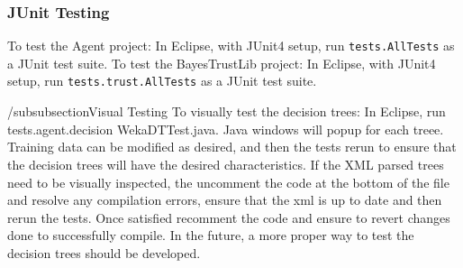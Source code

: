 \subsubsection{JUnit Testing}
To test the Agent project: In Eclipse, with JUnit4 setup, run
\verb+tests.AllTests+ as a JUnit test suite.  To test the BayesTrustLib project:
In Eclipse, with JUnit4 setup, run \verb+tests.trust.AllTests+ as a JUnit test
suite.

/subsubsection{Visual Testing}
To visually test the decision trees: In Eclipse, run tests.agent.decision WekaDTTest.java.
Java windows will popup for each treee.  Training data can be modified as desired,
and then the tests rerun to ensure that the decision trees will have the desired characteristics.
If the XML parsed trees need to be visually inspected, the uncomment the code at the bottom of the file
and resolve any compilation errors, ensure that the xml is up to date and then rerun the tests.  Once
satisfied recomment the code and ensure to revert changes done to successfully compile.  In the future, 
a more proper way to test the decision trees should be developed.
